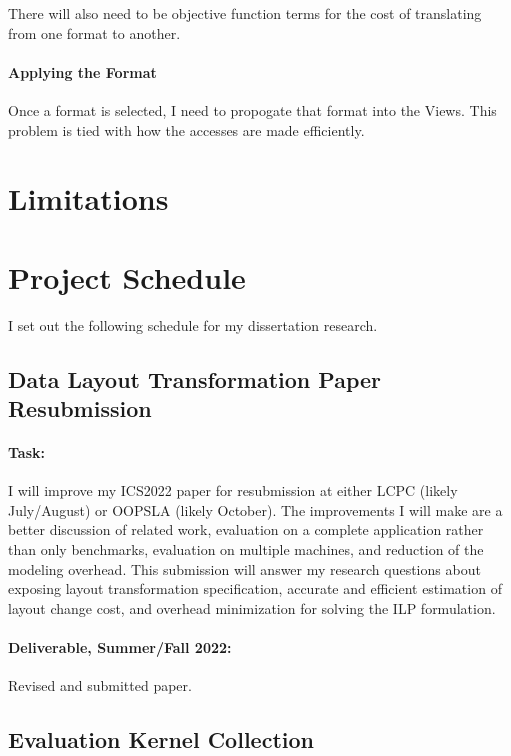 \documentclass{article}
\begin{document}
There will also need to be objective function terms for the cost of translating from one format to another. 

\paragraph{Applying the Format}
Once a format is selected, I need to propogate that format into the Views. 
This problem is tied with how the accesses are made efficiently. 

\section{Limitations}




\section{Project Schedule}
I set out the following schedule for my dissertation research.

\subsection{Data Layout Transformation Paper Resubmission}

\paragraph{Task:} I will improve my ICS2022 paper for resubmission at either LCPC (likely July/August) or OOPSLA (likely October). 
The improvements I will make are a better discussion of related work, evaluation on a complete application rather than only benchmarks, evaluation on multiple machines, and reduction of the modeling overhead.
This submission will answer my research questions about exposing layout transformation specification, accurate and efficient estimation of layout change cost, and overhead minimization for solving the ILP formulation.

\paragraph{Deliverable, Summer/Fall 2022:} Revised and submitted paper.


\subsection{Evaluation Kernel Collection}
\end{document}
